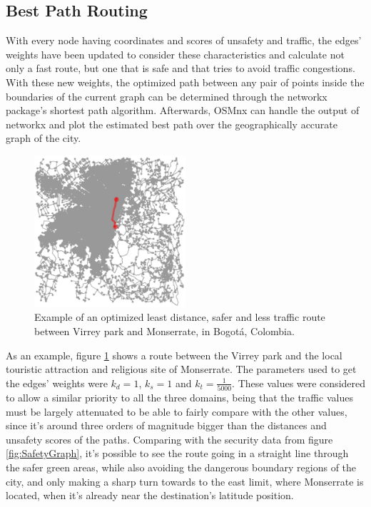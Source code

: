 \documentclass[runningheads]{llncs}
\begin{document}
\subsection{Best Path Routing}

With every node having coordinates and scores of unsafety and traffic, the edges' weights have been updated to consider these characteristics and calculate not only a fast route, but one that is safe and that tries to avoid traffic congestions. With these new weights, the optimized path between any pair of points inside the boundaries of the current graph can be determined through the networkx package's shortest path algorithm. Afterwards, OSMnx can handle the output of networkx and plot the estimated best path over the geographically accurate graph of the city.

\begin{figure}[!h]
	\centering
	\includegraphics[width=0.5\textwidth]{Images/GrafoBogotaRutaConPesos}
	\caption{Example of an optimized least distance, safer and less traffic route between Virrey park and Monserrate, in Bogotá, Colombia.}
    \label{fig:ExampleBestRoute}
\end{figure}

As an example, figure \ref{fig:ExampleBestRoute} shows a route between the Virrey park and the local touristic attraction and religious site of Monserrate. The parameters used to get the edges' weights were $k_d = 1$, $k_s = 1$ and $k_t = \frac{1}{5000}$. These values were considered to allow a similar priority to all the three domains, being that the traffic values must be largely attenuated to be able to fairly compare with the other values, since it's around three orders of magnitude bigger than the distances and unsafety scores of the paths. Comparing with the security data from figure \ref{fig:SafetyGraph}, it's possible to see the route going in a straight line through the safer green areas, while also avoiding the dangerous boundary regions of the city, and only making a sharp turn towards to the east limit, where Monserrate is located, when it's already near the destination's latitude position.
\end{document}
